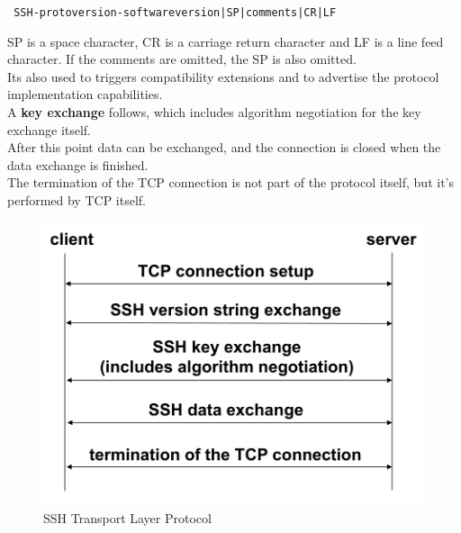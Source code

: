 \begin{center}
\texttt{
SSH-protoversion-softwareversion|SP|comments|CR|LF
}\\
\end{center}
SP is a space character, CR is a carriage return character and LF is a
line feed character. If the comments are omitted, the SP is also
omitted.\\
Its also used to triggers compatibility extensions and to advertise
the protocol implementation capabilities.\\
A \textbf{key exchange} follows, which includes algorithm negotiation
for the key exchange itself.\\
After this point data can be exchanged, and the connection is closed
when the data exchange is finished.\\
The termination of the TCP connection is not part of the protocol
itself, but it's performed by TCP itself.\\
\begin{figure}[H]
  \centering
  \includegraphics[width=.6\textwidth]{img/SSH layer protocol.png}
  \caption{SSH Transport Layer Protocol}
  \label{fig:ssh-layer-protocol}
\end{figure}
